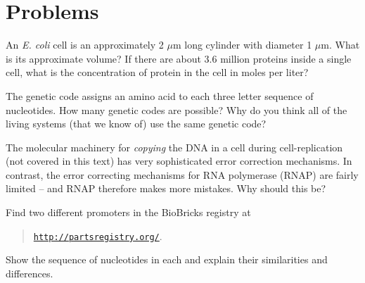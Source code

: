 





\section{Problems}

\setcounter{exercount}{0}

\begin{exercise}
  An {\em E. coli} cell is an approximately 2 $\mu$m long cylinder with
  diameter 1 $\mu$m. What is its approximate volume? If there are
  about 3.6 million proteins inside a single cell, what is the
  concentration of protein in the cell in moles per liter?
\end{exercise}

\begin{exercise}
  The genetic code assigns an amino acid to each three letter sequence
  of nucleotides. How many genetic codes are possible? Why do you
  think all of the living systems (that we know of) use the same
  genetic code?
\end{exercise}

\begin{exercise}
  The molecular machinery for {\em copying} the DNA in a cell during
  cell-replication (not covered in this text) has very sophisticated
  error correction mechanisms. In contrast, the error correcting
  mechanisms for RNA polymerase (RNAP) are fairly limited -- and RNAP
  therefore makes more mistakes. Why should this be?
\end{exercise}

\begin{exercise}
  Find two different promoters in the BioBricks registry at
\begin{quote}
 \href{http://partsregistry.org/}{\tt http://partsregistry.org/}.
\end{quote}
Show the sequence of nucleotides in each and explain their
similarities and differences.
\end{exercise}

